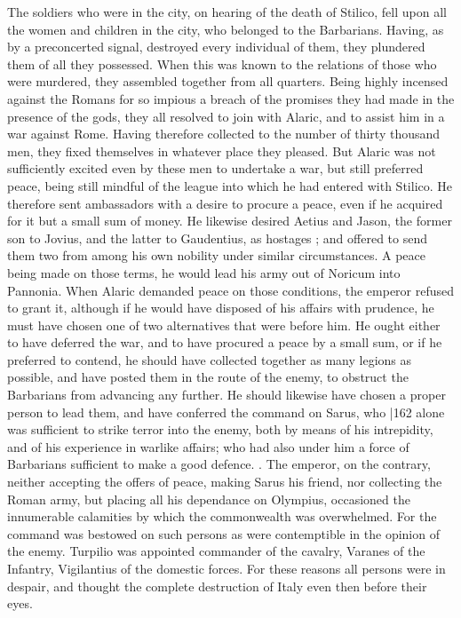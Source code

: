 The soldiers who were in the city, on hearing of the death of Stilico, fell upon all the women and children in the city, who belonged to the Barbarians. Having, as by a preconcerted signal, destroyed every individual of them, they plundered them of all they possessed. When this was known to the relations of those who were murdered, they assembled together from all quarters. Being highly incensed against the Romans for so impious a breach of the promises they had made in the presence of the gods, they all resolved to join with Alaric, and to assist him in a war against Rome. Having therefore collected to the number of thirty thousand men, they fixed themselves in whatever place they pleased. But Alaric was not sufficiently excited even by these men to undertake a war, but still preferred peace, being still mindful of the league into which he had entered with Stilico. He therefore sent ambassadors with a desire to procure a peace, even if he acquired for it but a small sum of money. He likewise desired Aetius and Jason, the former son to Jovius, and the latter to Gaudentius, as hostages ; and offered to send them two from among his own nobility under similar circumstances. A peace being made on those terms, he would lead his army out of Noricum into Pannonia. When Alaric demanded peace on those conditions, the emperor refused to grant it, although if he would have disposed of his affairs with prudence, he must have chosen one of two alternatives that were before him. He ought either to have deferred the war, and to have procured a peace by a small sum, or if he preferred to contend, he should have collected together as many legions as possible, and have posted them in the route of the enemy, to obstruct the Barbarians from advancing any further. He should likewise have chosen a proper person to lead them, and have conferred the command on Sarus, who
|162 alone was sufficient to strike terror into the enemy, both by means of his intrepidity, and of his experience in warlike affairs; who had also under him a force of Barbarians sufficient to make a good defence. . The emperor, on the contrary, neither accepting the offers of peace, making Sarus his friend, nor collecting the Roman army, but placing all his dependance on Olympius, occasioned the innumerable calamities by which the commonwealth
was overwhelmed. For the command was bestowed on such persons as were contemptible in the opinion of the enemy. Turpilio was appointed commander of the cavalry, Varanes of the Infantry, Vigilantius of the domestic forces. For these reasons all persons were in despair, and thought the complete destruction of Italy even then before their eyes.

